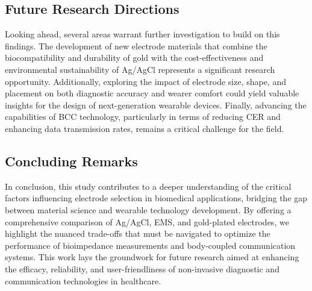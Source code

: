 \documentclass[conference]{IEEEtran}
\begin{document}
\subsection{Future Research Directions}

Looking ahead, several areas warrant further investigation to build on this findings. The development of new electrode materials that combine the biocompatibility and durability of gold with the cost-effectiveness and environmental sustainability of Ag/AgCl represents a significant research opportunity. Additionally, exploring the impact of electrode size, shape, and placement on both diagnostic accuracy and wearer comfort could yield valuable insights for the design of next-generation wearable devices. Finally, advancing the capabilities of \gls{BCC} technology, particularly in terms of reducing \gls{CER} and enhancing data transmission rates, remains a critical challenge for the field.

\subsection{Concluding Remarks}

In conclusion, this study contributes to a deeper understanding of the critical factors influencing electrode selection in biomedical applications, bridging the gap between material science and wearable technology development. By offering a comprehensive comparison of Ag/AgCl, EMS, and gold-plated electrodes, we highlight the nuanced trade-offs that must be navigated to optimize the performance of bioimpedance measurements and body-coupled communication systems. This work lays the groundwork for future research aimed at enhancing the efficacy, reliability, and user-friendliness of non-invasive diagnostic and communication technologies in healthcare.
\end{document}
